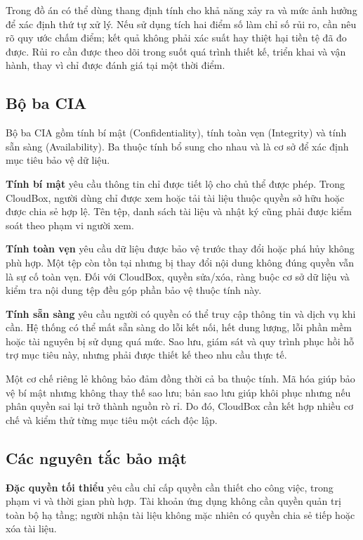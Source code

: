 Trong đồ án có thể dùng thang định tính cho khả năng xảy ra và mức ảnh hưởng để xác định thứ tự xử lý. Nếu sử dụng tích hai điểm số làm chỉ số rủi ro, cần nêu rõ quy ước chấm điểm; kết quả không phải xác suất hay thiệt hại tiền tệ đã đo được. Rủi ro cần được theo dõi trong suốt quá trình thiết kế, triển khai và vận hành, thay vì chỉ được đánh giá tại một thời điểm.\cite{ccsp}

\subsection{Bộ ba CIA}
Bộ ba CIA gồm tính bí mật (Confidentiality), tính toàn vẹn (Integrity) và tính sẵn sàng (Availability). Ba thuộc tính bổ sung cho nhau và là cơ sở để xác định mục tiêu bảo vệ dữ liệu.

\textbf{Tính bí mật} yêu cầu thông tin chỉ được tiết lộ cho chủ thể được phép. Trong CloudBox, người dùng chỉ được xem hoặc tải tài liệu thuộc quyền sở hữu hoặc được chia sẻ hợp lệ. Tên tệp, danh sách tài liệu và nhật ký cũng phải được kiểm soát theo phạm vi người xem.

\textbf{Tính toàn vẹn} yêu cầu dữ liệu được bảo vệ trước thay đổi hoặc phá hủy không phù hợp. Một tệp còn tồn tại nhưng bị thay đổi nội dung không đúng quyền vẫn là sự cố toàn vẹn. Đối với CloudBox, quyền sửa/xóa, ràng buộc cơ sở dữ liệu và kiểm tra nội dung tệp đều góp phần bảo vệ thuộc tính này.

\textbf{Tính sẵn sàng} yêu cầu người có quyền có thể truy cập thông tin và dịch vụ khi cần. Hệ thống có thể mất sẵn sàng do lỗi kết nối, hết dung lượng, lỗi phần mềm hoặc tài nguyên bị sử dụng quá mức. Sao lưu, giám sát và quy trình phục hồi hỗ trợ mục tiêu này, nhưng phải được thiết kế theo nhu cầu thực tế.

Một cơ chế riêng lẻ không bảo đảm đồng thời cả ba thuộc tính. Mã hóa giúp bảo vệ bí mật nhưng không thay thế sao lưu; bản sao lưu giúp khôi phục nhưng nếu phân quyền sai lại trở thành nguồn rò rỉ. Do đó, CloudBox cần kết hợp nhiều cơ chế và kiểm thử từng mục tiêu một cách độc lập.

\subsection{Các nguyên tắc bảo mật}
\textbf{Đặc quyền tối thiểu} yêu cầu chỉ cấp quyền cần thiết cho công việc, trong phạm vi và thời gian phù hợp. Tài khoản ứng dụng không cần quyền quản trị toàn bộ hạ tầng; người nhận tài liệu không mặc nhiên có quyền chia sẻ tiếp hoặc xóa tài liệu.


